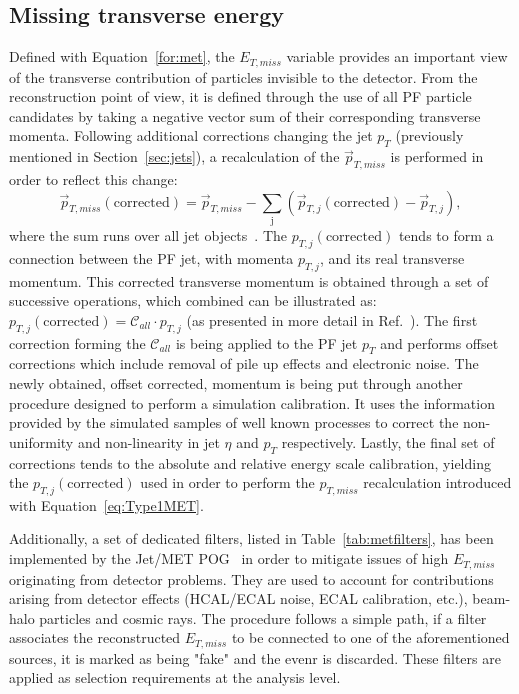 \subsection{Missing transverse energy}
\label{sec:pf_met_reconstruction}
\hspace{10pt} Defined with Equation~\ref{for:met}, the $E_{T,miss}$ variable provides an important view of the transverse contribution of particles invisible to the detector. From the reconstruction point of view, it is defined through the use of all PF particle candidates by taking a negative vector sum of their corresponding transverse momenta. Following additional corrections changing the jet $p_T$ (previously mentioned in Section~\ref{sec:jets}), a recalculation of the $\vec{p}_{T,miss}$ is performed in order to reflect this change:
\begin{equation}
\vec{p}_{T,miss}(\mathrm{corrected})
=\vec{p}_{T,miss} - \sum_\mathrm{j} (\vec{p}_{T,j}({\mathrm{corrected}})-\vec{p}_{T,j}),
\label{eq:Type1MET}
\end{equation}
where the sum runs over all jet objects~\cite{note:AN_19_257}. The $p_{T,j}({\mathrm{corrected}})$ tends to form a connection between the PF jet, with momenta $p_{T,j}$, and its real transverse momentum. This corrected transverse momentum is obtained through a set of successive operations, which combined can be illustrated as: $p_{T,j}({\mathrm{corrected}})=\mathcal{C}_{all}\cdot p_{T,j}$ (as presented in more detail in Ref.~\cite{paper:jet_cal}). The first correction forming the $\mathcal{C}_{all}$ is being applied to the PF jet $p_T$ and performs offset corrections which include removal of pile up effects and electronic noise. The newly obtained, offset corrected, momentum is being put through another procedure designed to perform a simulation calibration. It uses the information provided by the simulated samples of well known processes to correct the non-uniformity and non-linearity in jet $\eta$ and $p_T$ respectively. Lastly, the final set of corrections tends to the absolute and relative energy scale calibration, yielding the $p_{T,j}({\mathrm{corrected}})$ used in order to perform the $p_{T,miss}$ recalculation introduced with Equation~\ref{eq:Type1MET}.

\hspace{10pt} Additionally, a set of dedicated filters, listed in Table~\ref{tab:metfilters}, has been implemented by the Jet/MET POG~\cite{twiki_met_filters, note:AN_19_257} in order to mitigate issues of high $E_{T,miss}$ originating from detector problems. They are used to account for contributions arising from detector effects (HCAL/ECAL noise, ECAL calibration, etc.), beam-halo particles and cosmic rays. The procedure follows a simple path, if a filter associates the reconstructed $E_{T,miss}$ to be connected to one of the aforementioned sources, it is marked as being "fake" and the evenr is discarded. These filters are applied as selection requirements at the analysis level.

